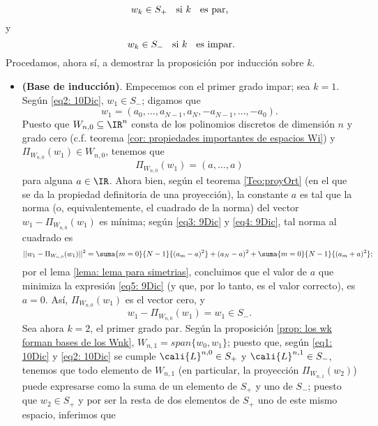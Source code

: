 \begin{equation}
\label{eq1: 10Dic}
w_{k} \in S_{+} \hspace{0.2cm} \text{ si }
k \hspace{0.2cm} \text{ es par, }
\end{equation}
y
\begin{equation}
\label{eq2: 10Dic}
w_{k} \in S_{-} \hspace{0.2cm} \text{ si }
k \hspace{0.2cm} \text{ es impar.}
\end{equation}
Procedamos, ahora sí, a demostrar
la proposición por inducción sobre $k$.
\begin{itemize}
\item \textbf{(Base de inducción)}. 
Empecemos con el primer grado impar;
sea $k=1$. 
Según \eqref{eq2: 10Dic},
$w_{1} \in S_{-}$; digamos que
\begin{equation}
\label{eq3: 9Dic}
w_{1}=(a_{0}, \ldots , a_{N-1}, a_{N}, -a_{N-1}, \ldots , -a_{0} ).
\end{equation}
Puesto que $W_{n,0} \subseteq \IR^{n}$ consta 
de los polinomios discretos de
dimensión $n$ y grado cero (c.f. 
teorema \ref{cor: propiedades importantes de espacios Wi})
y $\Pi_{W_{n,0}}(w_{1}) \in W_{n,0}$, tenemos que
\begin{equation}
\label{eq4: 9Dic}
\Pi_{W_{n,0}}(w_{1})=(a, \ldots , a)
\end{equation}
para alguna $a \in \IR$.
Ahora bien, según el teorema
\ref{Teo:proyOrt} (en el que se da la propiedad definitoria de una proyección),
la constante $a$ es tal que
la norma (o, equivalentemente,
el cuadrado de la norma) del vector 
$w_{1}-\Pi_{W_{n,0}}(w_{1})$ es mínima; según 
\eqref{eq3: 9Dic} y \eqref{eq4: 9Dic}, tal norma
al cuadrado es 
\begin{equation}
\label{eq5: 9Dic}
|| w_{1}-\Pi_{W_{n,0}}(w_{1}) ||^{2}= 
\suma{m=0}{N-1}{(a_{m}-a)^{2}} + (a_{N}-a)^{2}
+ \suma{m=0}{N-1}{(a_{m}+a)^{2}};
\end{equation}
por el lema \ref{lema: lema para simetrias}, 
concluimos que el valor de $a$ que minimiza la expresión
\eqref{eq5: 9Dic}
(y que, por lo tanto, es el valor correcto), es
$a=0$.
Así, $\Pi_{W_{n,0}}(w_{1})$ es el vector cero, y
\[
w_{1}-\Pi_{W_{n,0}}(w_{1}) = w_{1} \in S_{-}.
\]
Sea ahora $k=2$, el primer grado par.
Según la proposición 
\ref{prop: los wk forman bases de los Wnk},
$W_{n,1} = span \{ w_{0}, w_{1}\}$;
puesto que, según 
\eqref{eq1: 10Dic} y \eqref{eq2: 10Dic}
se cumple
$\cali{L}^{n,0} \in S_{+}$ y 
$\cali{L}^{n,1} \in S_{-}$, tenemos que todo elemento de 
$W_{n,1}$ (en particular, la proyección $\Pi_{W_{n,1}}(w_{2})$)
puede expresarse como la suma de un elemento de $S_{+}$ y uno
de $S_{-}$; puesto que $w_{2} \in S_{+}$ y por ser la resta
de dos elementos de $S_{+}$ uno de este mismo espacio, inferimos que


\end{itemize}
